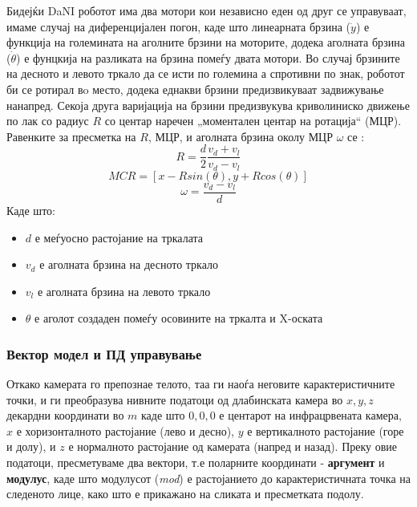 \documentclass[12pt]{article}
\begin{document}
      Бидејќи DaNI роботот има два мотори кои независно еден од друг се управуваат, имаме случај на диференцијален погон, каде што линеарната брзина ($\dot y$) е функција на големината на аголните брзини на моторите, додека аголната брзина ($\dot \theta$) е фунцкија на разликата на брзина помеѓу двата мотори. Во случај брзините на десното и левото тркало да се исти по големина а спротивни по знак, роботот би се ротирал вo место, додека еднакви брзини предизвикуваат задвижување нанапред. Секоја друга варијација на брзини предизвукува криволиниско движење по лак со радиус $R$ со центар наречен „моментален центар на ротација“ (МЦР). Равенките за пресметка на $R$, МЦР, и аголната брзина околу МЦР $\omega$ се \cite{differential_drive_robots}:
      $$ R = \frac{d}{2} \frac{v_d + v_l}{v_d - v_l} $$
      $$ {MCR} = [x - Rsin(\theta), y + Rcos(\theta)] $$
      $$ \omega = \frac{v_d - v_l}{d} $$
      Каде што:
      \begin{itemize}
        \item $d$ е меѓуосно растојание на тркалата
        \item $v_d$ е аголната брзина на десното тркало
        \item $v_l$ е аголната брзина на левото тркало
        \item $\theta$ е аголот создаден помеѓу осовините на тркалта и X-оската
      \end{itemize}

    \subsubsection{Вектор модел и ПД управување}

      Откако камерата го препознае телото, таа ги наоѓа неговите карактеристичните точки, и ги преобразува нивните податоци од длабинската камера во $ x,y,z $ декардни координати во $ m $ каде што $ 0,0,0 $ е центарот на инфрацрвената камера, $x$ е хоризонталното растојание (лево и десно), $y$ е вертикалното растојание (горе и долу), и $z$ е нормалното растојание од камерата (напред и назад). Преку овие податоци, пресметуваме два вектори, т.е поларните координати - \textbf{аргумент} и \textbf{модулус}, каде што модулусот (\textit{mod}) е растојанието до карактеристичната точка на следеното лице, како што е прикажано на сликата и пресметката подолу.
\end{document}
